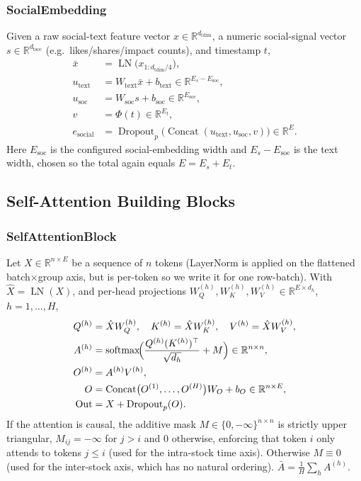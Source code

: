 \documentclass[stu,floatsintext]{apa7}
\newcommand{\R}{\mathbb{R}}
\newcommand{\softmax}{\operatorname{softmax}}
\newcommand{\LN}{\operatorname{LN}}
\newcommand{\Concat}{\operatorname{Concat}}
\begin{document}
\subsubsection{SocialEmbedding}

Given a raw social-text feature vector $x\in\R^{d_{\text{tdim}}}$, a numeric social-signal vector $s\in\R^{d_{\text{tsoc}}}$ (e.g.\ likes/shares/impact counts), and timestamp $t$,
\begin{align}
  \bar x &= \LN\bigl(x_{1:d_{\text{tdim}}/4}\bigr), \\
  u_{\mathrm{text}} &= W_{\mathrm{text}}\bar x + b_{\mathrm{text}} \in\R^{E_s-E_{\mathrm{soc}}}, \\
  u_{\mathrm{soc}} &= W_{\mathrm{soc}} s + b_{\mathrm{soc}} \in\R^{E_{\mathrm{soc}}}, \\
  v &= \Phi(t)\in\R^{E_t}, \\
  e_{\mathrm{social}} &= \operatorname{Dropout}_p\bigl(\Concat(u_{\mathrm{text}}, u_{\mathrm{soc}}, v)\bigr)
  \in\R^{E}.
\end{align}
Here $E_{\mathrm{soc}}$ is the configured social-embedding width and $E_s - E_{\mathrm{soc}}$ is the text
width, chosen so the total again equals $E=E_s+E_t$.

\subsection{Self-Attention Building Blocks}

\subsubsection{SelfAttentionBlock}

Let $X\in\R^{n\times E}$ be a sequence of $n$ tokens (LayerNorm is applied on the flattened
batch$\times$group axis, but is per-token so we write it for one row-batch). With $\hat X = \LN(X)$, and
per-head projections $W_Q^{(h)},W_K^{(h)},W_V^{(h)}\in\R^{E\times d_h}$, $h=1,\dots,H$,
\begin{align}
  Q^{(h)} &= \hat X W_Q^{(h)}, \quad K^{(h)} = \hat X W_K^{(h)}, \quad V^{(h)} = \hat X W_V^{(h)}, \\
  A^{(h)} &= \softmax\!\Bigl(\frac{Q^{(h)}(K^{(h)})^\top}{\sqrt{d_h}} + M\Bigr) \in\R^{n\times n}, \\
  O^{(h)} &= A^{(h)} V^{(h)}, \\
  O &= \Concat\bigl(O^{(1)},\dots,O^{(H)}\bigr) W_O + b_O \in\R^{n\times E}, \\
  \operatorname{Out} &= X + \operatorname{Dropout}_p(O).
\end{align}
If the attention is causal, the additive mask $M\in\{0,-\infty\}^{n\times n}$ is strictly upper triangular,
$M_{ij}=-\infty$ for $j>i$ and $0$ otherwise, enforcing that token $i$ only attends to tokens $j\le i$
(used for the intra-stock time axis). Otherwise $M\equiv 0$ (used for the inter-stock axis, which has no
natural ordering).
$\bar A = \tfrac1H\sum_h A^{(h)}$.
\end{document}
